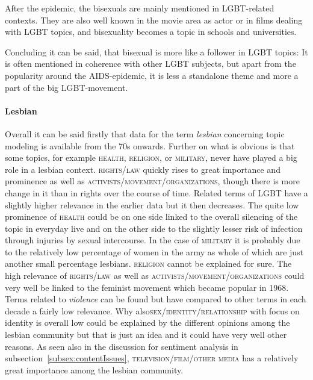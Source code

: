 \documentclass[10pt,a4paper,twocolumn]{scrartcl}
\begin{document}
After the epidemic, the bisexuals are mainly mentioned in LGBT-related contexts. They are also well known in the movie area as actor or in films dealing with LGBT topics, and bisexuality becomes a topic in schools and universities.

Concluding it can be said, that bisexual is more like a follower in LGBT topics: It is often mentioned in coherence with other LGBT subjects, but apart from the popularity around the AIDS-epidemic, it is less a standalone theme and more a part of the big LGBT-movement.

\paragraph*{Lesbian} Overall it can be said firstly that data for the term \textit{lesbian} concerning topic modeling is available from the 70s onwards. Further on what is obvious is that some topics, for example \textsc{health}, \textsc{religion}, or \textsc{military}, never have played a big role in a lesbian context. \textsc{rights/law} quickly rises to great importance and prominence as well as \textsc{activists/movement/organizations}, though there is more change in it than in rights over the course of time. Related terms of LGBT have a slightly higher relevance in the earlier data but it then decreases. The quite low prominence of \textsc{health} could be on one side linked to the overall silencing of the topic in everyday live and on the other side to the slightly lesser risk of infection through injuries by sexual intercourse. In the case of \textsc{military} it is probably due to the relatively low percentage of women in the army as whole of which are just another small percentage lesbians. \textsc{religion} cannot be explained for sure. The high relevance of \textsc{rights/law} as well as \textsc{activists/movement/organizations} could very well be linked to the feminist movement which became popular in 1968. Terms related to \textit{violence} can be found but have compared to other terms in each decade a fairly low relevance. Why also\textsc{sex/identity/relationship} with focus on identity is overall low could be explained by the different opinions among the lesbian community but that is just an idea and it could have very well other reasons. As seen also in the discussion for sentiment analysis in subsection~\ref{subsex:contentIssues}, \textsc{television/film/other media} has a relatively great importance among the lesbian community.
\end{document}
